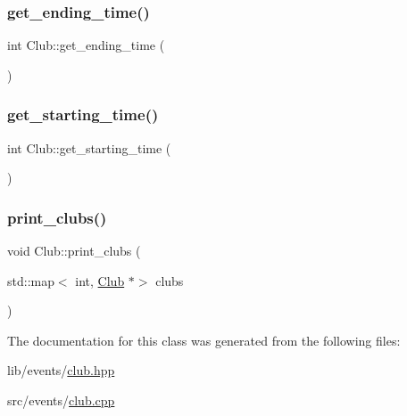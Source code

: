 \subsubsection{\texorpdfstring{get\+\_\+ending\+\_\+time()}{get\_ending\_time()}}
{\footnotesize\ttfamily int Club\+::get\+\_\+ending\+\_\+time (\begin{DoxyParamCaption}{ }\end{DoxyParamCaption})\hspace{0.3cm}{\ttfamily [inline]}}

\mbox{\label{class_club_af4268a65e89b9bc9e4d8bb6ea4d46605}} 
\subsubsection{\texorpdfstring{get\+\_\+starting\+\_\+time()}{get\_starting\_time()}}
{\footnotesize\ttfamily int Club\+::get\+\_\+starting\+\_\+time (\begin{DoxyParamCaption}{ }\end{DoxyParamCaption})\hspace{0.3cm}{\ttfamily [inline]}}

\mbox{\label{class_club_aaf9725356f46fd58d1f6a83bed6edc00}} 
\subsubsection{\texorpdfstring{print\+\_\+clubs()}{print\_clubs()}}
{\footnotesize\ttfamily void Club\+::print\+\_\+clubs (\begin{DoxyParamCaption}\item[{std\+::map$<$ int, \hyperlink{class_club}{Club} $\ast$$>$}]{clubs }\end{DoxyParamCaption})\hspace{0.3cm}{\ttfamily [static]}}



The documentation for this class was generated from the following files\+:\begin{DoxyCompactItemize}
\item 
lib/events/\hyperlink{club_8hpp}{club.\+hpp}\item 
src/events/\hyperlink{club_8cpp}{club.\+cpp}\end{DoxyCompactItemize}

